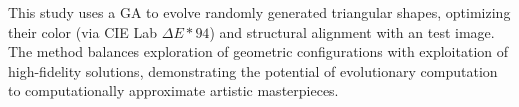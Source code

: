 This study uses a GA to evolve randomly generated triangular shapes, optimizing their color
(via CIE Lab $\Delta E*94$)
and structural alignment with an test image. The method balances exploration of geometric configurations with exploitation of high-fidelity solutions,
demonstrating the potential of evolutionary computation to computationally approximate artistic masterpieces.

